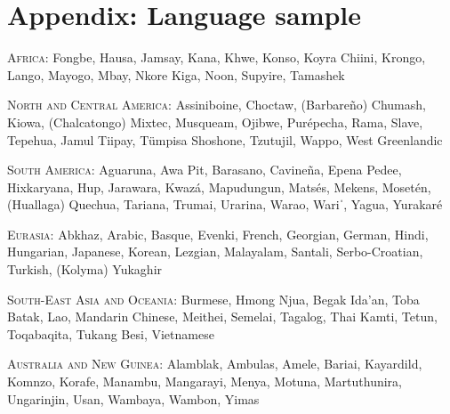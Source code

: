 \documentclass[output=paper,colorlinks,citecolor=brown]{langscibook}
\begin{document}
\section*{Appendix: Language sample}

\textsc{Africa}: Fongbe, Hausa, Jamsay, Kana, Khwe, Konso, Koyra Chiini, Krongo, Lango, Mayogo, Mbay, Nkore Kiga, Noon, Supyire, Tamashek

\textsc{North} \textsc{and} \textsc{Central} \textsc{America}: Assiniboine, Choctaw, (Barbareño) Chumash, Kiowa, (Chalcatongo) Mixtec, Musqueam, Ojibwe, Purépecha, Rama, Slave, Tepehua, Jamul Tiipay, Tümpisa Shoshone, Tzutujil, Wappo, West Greenlandic

\textsc{South} \textsc{America}: Aguaruna, Awa Pit, Barasano, Cavineña, Epena Pedee, Hixkaryana, Hup, Jarawara, Kwazá, Mapudungun, Matsés, Mekens, Mosetén, (Huallaga) Quechua, Tariana, Trumai, Urarina, Warao, Wariˈ, Yagua, Yurakaré

\textsc{Eurasia}: Abkhaz, Arabic, Basque, Evenki, French, Georgian, German, Hindi, Hungarian, Japanese, Korean, Lezgian, Malayalam, Santali, Serbo-Croatian, Turkish, (Kolyma) Yukaghir

\textsc{South-East} \textsc{Asia} \textsc{and} \textsc{Oceania}: Burmese, Hmong Njua, Begak Ida’an, Toba Batak, Lao, Mandarin Chinese, Meithei, Semelai, Tagalog, Thai Kamti, Tetun, Toqabaqita, Tukang Besi, Vietnamese

\textsc{Australia} \textsc{and} \textsc{New} \textsc{Guinea}: Alamblak, Ambulas, Amele, Bariai, Kayardild, Komnzo, Korafe, Manambu, Mangarayi, Menya, Motuna, Martuthunira, Ungarinjin, Usan, Wambaya, Wambon, Yimas

\sloppy\printbibliography[heading=subbibliography,notkeyword=this]
\end{document}
